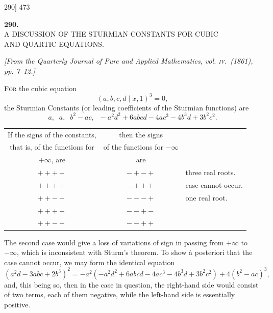 \documentclass[11pt]{article}
\begin{document}
\newpage
\begin{center}
\textsc{290]} \hfill 473
\end{center}

\bigskip

\begin{center}
\textbf{\large 290.}\\[1ex]
\textsc{A DISCUSSION OF THE STURMIAN CONSTANTS FOR CUBIC\\
AND QUARTIC EQUATIONS.}
\end{center}

\begin{center}
\textit{[From the Quarterly Journal of Pure and Applied Mathematics, vol. \textsc{iv}.\ (1861),
pp. 7--12.]}
\end{center}

\medskip

\textsc{For} the cubic equation
\[ (a,b,c,d\mid x,1)^{3}=0, \]
the Sturmian Constants (or leading coefficients of the Sturmian functions) are
\[ a,\;\; a,\;\; b^{2}-ac,\;\; -a^{2}d^{2}+6abcd-4ac^{3}-4b^{3}d+3b^{2}c^{2}. \]

\begin{center}
\begin{tabular}{|c|c|l|}
\hline
If the signs of the constants, & then the signs & \\
that is, of the functions for & of the functions for $-\infty$ & \\
$+\infty$, are & are & \\
\hline
$++++$ & $-+-+$ & three real roots.\\
$++++$ & $-+++$ & case cannot occur.\\
$++-+$ & $---+$ & one real root.\\
$+++-$ & $--+-$ & \\
$++--$ & $--++$ & \\
\hline
\end{tabular}
\end{center}

\smallskip

The second case would give a loss of variations of sign in passing from $+\infty$ to $-\infty$,
which is inconsistent with Sturm's theorem. To show \`a posteriori that the case cannot
occur, we may form the identical equation
\[ (a^{2}d-3abc+2b^{3})^{2}=-a^{2}(-a^{2}d^{2}+6abcd-4ac^{3}-4b^{3}d+3b^{2}c^{2})+4(b^{2}-ac)^{3}, \]
and, this being so, then in the case in question, the right-hand side would consist of
two terms, each of them negative, while the left-hand side is essentially positive.
\end{document}
